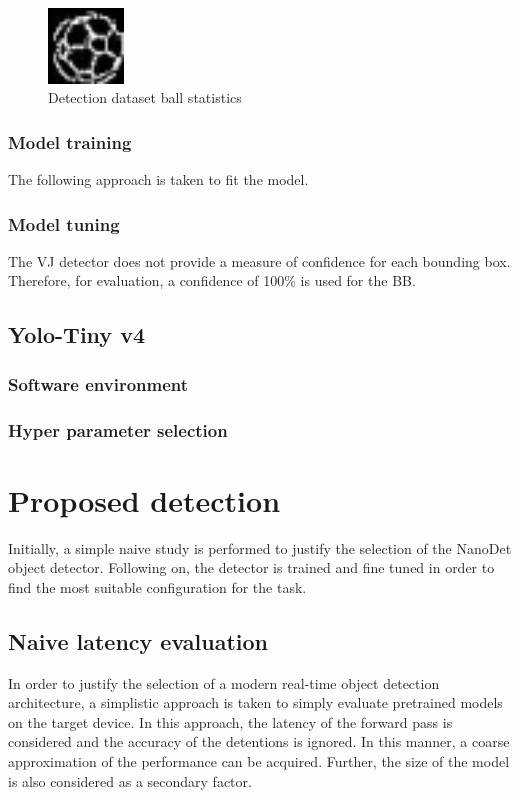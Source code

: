 \documentclass[a4paper,twoside,12pt]{report}
\begin{document}
\begin{figure}[h!]
\begin{center}
\includegraphics[width=2cm]{images/edge32.png}
\caption{Detection dataset ball statistics}
\label{fig:edgeball}
\end{center}
\end{figure}

\subsubsection{Model training}

The following approach is taken to fit the model.

\subsubsection{Model tuning}

The VJ detector does not provide a measure of confidence for each bounding box. Therefore, for evaluation, a confidence of 100\% is used for the BB.  

\subsection{Yolo-Tiny v4}

\subsubsection{Software environment}

\subsubsection{Hyper parameter selection}

\newpage
\section{Proposed detection}

Initially, a simple naive study is performed to justify the selection of the NanoDet object detector. Following on, the detector is trained and fine tuned in order to find the most suitable configuration for the task.

\subsection{Naive latency evaluation}
In order to justify the selection of a modern real-time object detection architecture, a simplistic approach is taken to simply evaluate pretrained models on the target device. In this approach, the latency of the forward pass is considered and the accuracy of the detentions is ignored. In this manner, a coarse approximation of the performance can be acquired. Further, the size of the model is also considered as a secondary factor.
\end{document}
